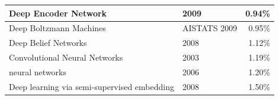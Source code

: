 \begin{table}[htbp]
\begin{center}
\begin{tabular}{|l|l|r|}
    Deep Encoder Network \cite{min2009large-margin}& 2009 & 0.94\% \\ \hline
    Deep Boltzmann Machines \cite{salakhutdinov2009deep}& AISTATS 2009 & 0.95\% \\ \hline
    Deep Belief Networks \cite{dahl2008cs81:}& 2008 & 1.12\% \\ \hline
    Convolutional Neural Networks  \cite{simard2003best}& 2003 & 1.19\% \\ \hline
    neural networks \cite{hinton2006reducing}& 2006 & 1.20\% \\ \hline
    Deep learning via semi-supervised embedding \cite{weston2012deep}& 2008 & 1.50\% \\ \hline
    \end{tabular}%
  \label{c5_mnist_rank}%
  \end{center}
\end{table}%

